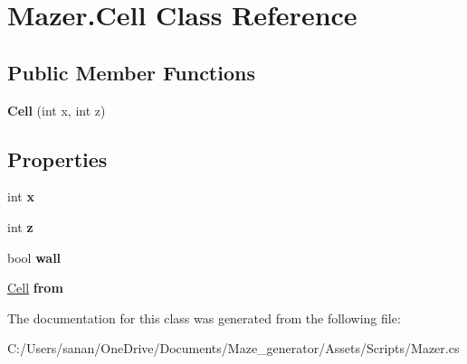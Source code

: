 \hypertarget{class_mazer_1_1_cell}{}\section{Mazer.\+Cell Class Reference}
\label{class_mazer_1_1_cell}
\subsection*{Public Member Functions}
\begin{DoxyCompactItemize}
\item 
\mbox{\label{class_mazer_1_1_cell_a31edc276dcd0c9199ca2c00d230a503f}} 
{\bfseries Cell} (int x, int z)
\end{DoxyCompactItemize}
\subsection*{Properties}
\begin{DoxyCompactItemize}
\item 
\mbox{\label{class_mazer_1_1_cell_ab5e4be45b351df12cb4b8cb065ed37af}} 
int {\bfseries x}
\item 
\mbox{\label{class_mazer_1_1_cell_ab9aa483c8af33fc39505f14d3fa07e72}} 
int {\bfseries z}
\item 
\mbox{\label{class_mazer_1_1_cell_ab19be8d01822f6ec313b4db97fcd2a65}} 
bool {\bfseries wall}
\item 
\mbox{\label{class_mazer_1_1_cell_a1aac26d91dfb9da773bae896c98d9a77}} 
\mbox{\hyperlink{class_mazer_1_1_cell}{Cell}} {\bfseries from}
\end{DoxyCompactItemize}


The documentation for this class was generated from the following file\+:\begin{DoxyCompactItemize}
\item 
C\+:/\+Users/sanan/\+One\+Drive/\+Documents/\+Maze\+\_\+generator/\+Assets/\+Scripts/Mazer.\+cs\end{DoxyCompactItemize}
